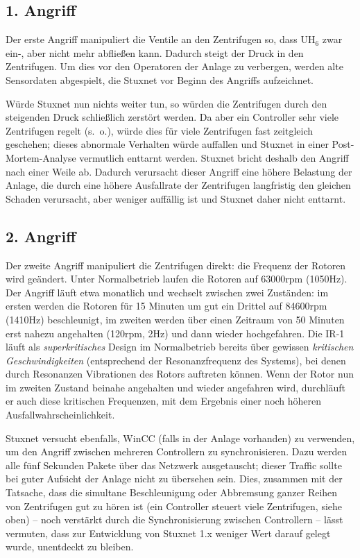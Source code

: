 \documentclass{article}
\begin{document}
\subsection{1. Angriff}

Der erste Angriff manipuliert die Ventile an den Zentrifugen so,
dass $\mathrm{UH}_6$ zwar ein-, aber nicht mehr abfließen kann.
Dadurch steigt der Druck in den Zentrifugen.
Um dies vor den Operatoren der Anlage zu verbergen,
werden alte Sensordaten abgespielt, die Stuxnet vor Beginn des Angriffs aufzeichnet.

Würde Stuxnet nun nichts weiter tun, so würden die Zentrifugen durch den steigenden Druck schließlich zerstört werden.
Da aber ein Controller sehr viele Zentrifugen regelt (s.~o.), würde dies für viele Zentrifugen fast zeitgleich geschehen;
dieses abnormale Verhalten würde auffallen und Stuxnet in einer Post-Mortem-Analyse vermutlich enttarnt werden.
Stuxnet bricht deshalb den Angriff nach einer Weile ab.
Dadurch verursacht dieser Angriff eine höhere Belastung der Anlage,
die durch eine höhere Ausfallrate der Zentrifugen langfristig den gleichen Schaden verursacht,
aber weniger auffällig ist und Stuxnet daher nicht enttarnt.

\subsection{2. Angriff}

Der zweite Angriff manipuliert die Zentrifugen direkt: die Frequenz der Rotoren wird geändert.
Unter Normalbetrieb laufen die Rotoren auf 63000rpm (1050Hz).
Der Angriff läuft etwa monatlich und wechselt zwischen zwei Zuständen:
im ersten werden die Rotoren für 15 Minuten um gut ein Drittel auf 84600rpm (1410Hz) beschleunigt,
im zweiten werden über einen Zeitraum von 50 Minuten erst nahezu angehalten (120rpm, 2Hz) und dann wieder hochgefahren.
Die IR-1 läuft als \emph{superkritisches} Design im Normalbetrieb bereits über gewissen \emph{kritischen Geschwindigkeiten}
(entsprechend der Resonanzfrequenz des Systems), bei denen durch Resonanzen Vibrationen des Rotors auftreten können.
Wenn der Rotor nun im zweiten Zustand beinahe angehalten und wieder angefahren wird,
durchläuft er auch diese kritischen Frequenzen, mit dem Ergebnis einer noch höheren Ausfallwahrscheinlichkeit.

Stuxnet versucht ebenfalls, WinCC (falls in der Anlage vorhanden) zu verwenden, um den Angriff zwischen mehreren Controllern zu synchronisieren.\cite{dossier} %
Dazu werden alle fünf Sekunden Pakete über das Netzwerk ausgetauscht; dieser Traffic sollte bei guter Aufsicht der Anlage nicht zu übersehen sein.
Dies, zusammen mit der Tatsache, dass die simultane Beschleunigung oder Abbremsung ganzer Reihen von Zentrifugen gut zu hören ist
(ein Controller steuert viele Zentrifugen, siehe oben) – noch verstärkt durch die Synchronisierung zwischen Controllern –
lässt vermuten, dass zur Entwicklung von Stuxnet 1.x weniger Wert darauf gelegt wurde, unentdeckt zu bleiben.
\end{document}
